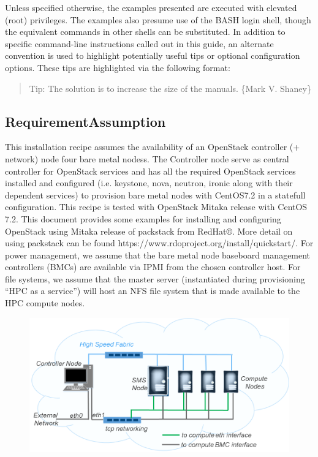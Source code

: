 \begin{section}
{Unless specified otherwise, the examples presented are executed with elevated (root) privileges. The
examples also presume use of the BASH login shell, though the equivalent commands in other shells can
be substituted. In addition to specific command-line instructions called out in this guide, an alternate
convention is used to highlight potentially useful tips or optional configuration options. These tips are
highlighted via the following format:

\begin{quote}Tip:
\small{The solution is to increase the size of the manuals. \{Mark V. Shaney\}} 
\end{quote}


\subsection*{RequirementAssumption}

This installation recipe assumes the availability of an OpenStack controller (+ network) node four bare metal nodess. The Controller node serve as central controller for OpenStack services and has all the required OpenStack services installed and configured (i.e. keystone, nova, neutron, ironic along with their dependent services) to provision bare metal nodes with CentOS7.2 in a statefull configuration. 
This recipe is tested with OpenStack Mitaka release with CentOS 7.2. This document provides some examples for installing and configuring OpenStack using Mitaka release of packstack from RedHat®. More detail on using packstack can be found https://www.rdoproject.org/install/quickstart/. 
For power management, we assume that the bare metal node baseboard management controllers (BMCs) are available via IPMI from the chosen controller host. For file systems, we assume that the master server (instantiated during provisioning “HPC as a service”) will host an NFS file system that is made available to the HPC compute nodes.

\begin{figure}
	\centering
	\includegraphics{./manifest/figures/HPCaaS-diagram}
	\caption[Openstack node example]{}
	\caption{}
	\label{fig:hpcaas-diagram}
\end{figure}


}
\end{section}

